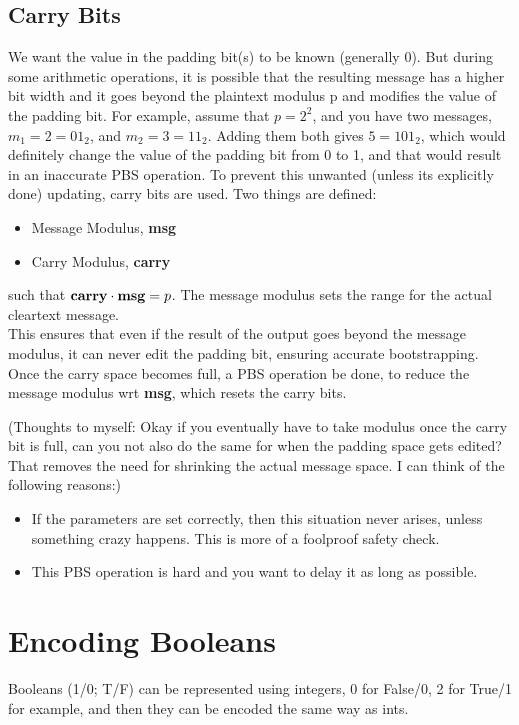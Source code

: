 \documentclass{report}
\begin{document}
\subsection{Carry Bits}
We want the value in the padding bit(s) to be known (generally 0). But during some arithmetic operations, it is possible that the resulting message has a higher bit width and it goes beyond the plaintext modulus p and modifies the value of the padding bit. For example, assume that $p = 2^2$, and you have two messages, $m_1 = 2 = 01_2$, and $m_2 = 3 = 11_2$. Adding them both gives $5 = 101_2$, which would definitely change the value of the padding bit from 0 to 1, and that would result in an inaccurate PBS operation. To prevent this unwanted (unless its explicitly done) updating, carry bits are used. Two things are defined:
\begin{itemize}
	\item Message Modulus, \textbf{msg}
	\item Carry Modulus, \textbf{carry}
\end{itemize}
such that $\text{\textbf{carry}} \cdot \text{\textbf{msg}} = p$. The message modulus sets the range for the actual cleartext message. \\
This ensures that even if the result of the output goes beyond the message modulus, it can never edit the padding bit, ensuring accurate bootstrapping. Once the carry space becomes full, a PBS operation be done, to reduce the message modulus wrt \textbf{msg}, which resets the carry bits. \newline

(Thoughts to myself: Okay if you eventually have to take modulus once the carry bit is full, can you not also do the same for when the padding space gets edited? That removes the need for shrinking the actual message space. I can think of the following reasons:)
\begin{itemize}
	\item If the parameters are set correctly, then this situation never arises, unless something crazy happens. This is more of a foolproof safety check.
	\item This PBS operation is hard and you want to delay it as long as possible.
\end{itemize}

\section{Encoding Booleans}
Booleans (1/0; T/F) can be represented using integers, 0 for False/0, 2 for True/1 for example, and then they can be encoded the same way as ints.
\end{document}
